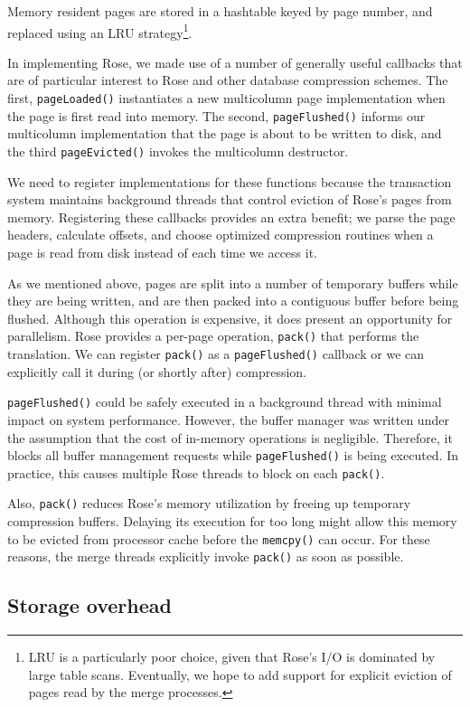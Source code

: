 \documentclass{vldb}
\newcommand{\rows}{Rose\xspace}
\newcommand{\rowss}{Rose's\xspace}
\begin{document}
Memory resident pages are stored in a
hashtable keyed by page number, and replaced using an LRU
strategy\footnote{LRU is a particularly poor choice, given that \rowss
  I/O is dominated by large table scans.  Eventually, we hope to add
  support for explicit eviction of pages read by the merge processes.}.

In implementing \rows, we made use of a number of generally useful
callbacks that are of particular interest to \rows and other database
compression schemes.  The first, {\tt pageLoaded()} instantiates a new
multicolumn page implementation when the page is first read into
memory.  The second, {\tt pageFlushed()} informs our multicolumn
implementation that the page is about to be written to disk, and the
third {\tt pageEvicted()} invokes the multicolumn destructor.

We need to register implementations for these functions because the
transaction system maintains background threads that control eviction of \rowss
pages from memory.  Registering these callbacks provides an extra
benefit; we parse the page headers, calculate offsets,
and choose optimized compression routines when a page is read from
disk instead of each time we access it.

As we mentioned above, pages are split into a number of temporary
buffers while they are being written, and are then packed into a
contiguous buffer before being flushed.  Although this operation is
expensive, it does present an opportunity for parallelism.  \rows
provides a per-page operation, {\tt pack()} that performs the
translation.  We can register {\tt pack()} as a {\tt pageFlushed()}
callback or we can explicitly call it during (or shortly after)
compression.

{\tt pageFlushed()} could be safely executed in a background thread
with minimal impact on system performance.  However, the buffer
manager was written under the assumption that the cost of in-memory
operations is negligible.  Therefore, it blocks all buffer management
requests while {\tt pageFlushed()} is being executed.  In practice,
this causes multiple \rows threads to block on each {\tt pack()}.

Also, {\tt pack()} reduces \rowss memory utilization by freeing up
temporary compression buffers.  Delaying its execution for too long
might allow this memory to be evicted from processor cache before the
{\tt memcpy()} can occur.  For these reasons, the merge threads
explicitly invoke {\tt pack()} as soon as possible.

\subsection{Storage overhead}
\end{document}
